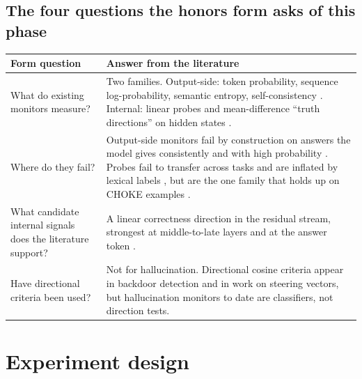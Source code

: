 \documentclass[11pt]{article}
\begin{document}
\subsection{The four questions the honors form asks of this phase}

\begin{table}[H]\centering\small
\begin{tabular}{p{}p{}}
\toprule
\textbf{Form question} & \textbf{Answer from the literature} \\
\midrule
What do existing monitors measure? & Two families. Output-side: token probability, sequence log-probability, semantic entropy, self-consistency \citep{farquhar2024semantic,manakul2023selfcheck,kadavath2022know}. Internal: linear probes and mean-difference ``truth directions'' on hidden states \citep{orgad2025know,marks2023geometry,burger2024truth}. \\
Where do they fail? & Output-side monitors fail by construction on answers the model gives consistently and with high probability \citep{farquhar2024semantic,simhi2025choke}. Probes fail to transfer across tasks and are inflated by lexical labels \citep{orgad2025know,janiak2025illusion}, but are the one family that holds up on CHOKE examples \citep{simhi2025choke}. \\
What candidate internal signals does the literature support? & A linear correctness direction in the residual stream, strongest at middle-to-late layers and at the answer token \citep{orgad2025know,marks2023geometry}. \\
Have directional criteria been used? & Not for hallucination. Directional cosine criteria appear in backdoor detection \citep{li2026cso} and in work on steering vectors, but hallucination monitors to date are classifiers, not direction tests. \\
\bottomrule
\end{tabular}
\end{table}

\section{Experiment design}
\end{document}
